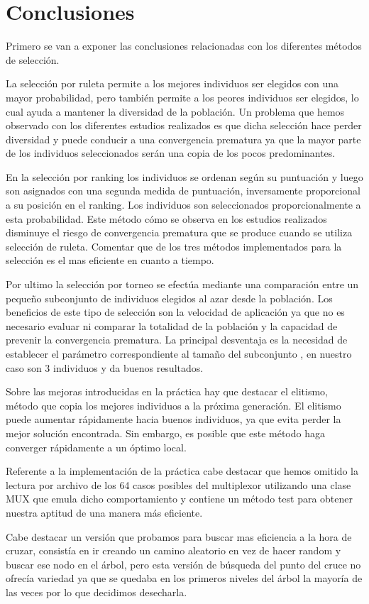 \documentclass[12pt]{article}
\begin{document}
	


\section{Conclusiones}

Primero se van a exponer las conclusiones relacionadas con los diferentes métodos de selección.

La selección por ruleta permite a los mejores individuos ser elegidos con una mayor probabilidad, pero también permite a los peores individuos ser elegidos, lo cual ayuda a mantener la diversidad de la población.
Un problema que hemos observado con los diferentes estudios realizados es que dicha selección hace perder diversidad y puede conducir a una convergencia prematura ya que la mayor parte de los individuos seleccionados serán una copia de los pocos predominantes.

En la selección por ranking los individuos se ordenan según su puntuación y luego son asignados con una segunda medida de puntuación, inversamente proporcional a su posición en el ranking. Los individuos son seleccionados proporcionalmente a esta probabilidad. Este método cómo se observa en los estudios realizados disminuye el riesgo de convergencia prematura que se produce cuando se utiliza selección de ruleta. Comentar que de los tres métodos implementados para la selección es el mas eficiente en cuanto a tiempo.

Por ultimo la selección por torneo se efectúa mediante una comparación entre un pequeño subconjunto de individuos elegidos al azar desde la población.
Los beneficios de este tipo de selección son la velocidad de aplicación ya que no es necesario evaluar ni comparar la totalidad de la población y la capacidad de prevenir la convergencia prematura. La principal desventaja es la necesidad de establecer el parámetro correspondiente al tamaño del subconjunto , en nuestro caso son 3 individuos y da buenos resultados.

Sobre las mejoras introducidas en la práctica hay que destacar el elitismo, método que copia los mejores individuos a la
próxima generación. El elitismo puede aumentar rápidamente hacia buenos individuos, ya que evita perder la mejor solución encontrada. Sin embargo,
es posible que este método haga converger rápidamente a un óptimo local.

Referente a la implementación de la práctica cabe destacar que hemos omitido la lectura por archivo de los 64 casos posibles del multiplexor utilizando una clase MUX que emula dicho comportamiento y contiene un método test para obtener nuestra aptitud de una manera más eficiente.

Cabe destacar un versión que probamos para buscar mas eficiencia a la hora de cruzar, consistía en ir creando un camino aleatorio en vez de hacer random y buscar ese nodo en el árbol, pero esta versión de búsqueda del punto del cruce no ofrecía variedad ya que se quedaba en los primeros niveles del árbol la mayoría de las veces por lo que decidimos desecharla.
\end{document}
